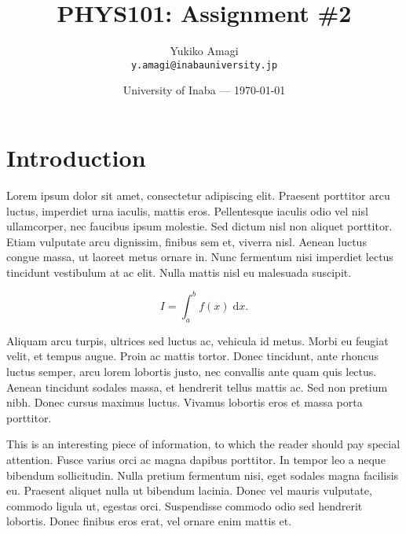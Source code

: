 \documentclass{article}
\title{PHYS101: Assignment \#2} %
\author{Yukiko Amagi\\ \texttt{y.amagi@inabauniversity.jp}} %
\date{University of Inaba --- \today} %
\begin{document}
\maketitle %


\section*{Introduction} %

Lorem ipsum dolor sit amet, consectetur adipiscing elit. Praesent porttitor arcu luctus, imperdiet urna iaculis, mattis eros. Pellentesque iaculis odio vel nisl ullamcorper, nec faucibus ipsum molestie. Sed dictum nisl non aliquet porttitor. Etiam vulputate arcu dignissim, finibus sem et, viverra nisl. Aenean luctus congue massa, ut laoreet metus ornare in. Nunc fermentum nisi imperdiet lectus tincidunt vestibulum at ac elit. Nulla mattis nisl eu malesuada suscipit.

\begin{equation}
	I = \int_{a}^{b} f(x) \; \text{d}x.
\end{equation}

Aliquam arcu turpis, ultrices sed luctus ac, vehicula id metus. Morbi eu feugiat velit, et tempus augue. Proin ac mattis tortor. Donec tincidunt, ante rhoncus luctus semper, arcu lorem lobortis justo, nec convallis ante quam quis lectus. Aenean tincidunt sodales massa, et hendrerit tellus mattis ac. Sed non pretium nibh. Donec cursus maximus luctus. Vivamus lobortis eros et massa porta porttitor.

\begin{info} %
	This is an interesting piece of information, to which the reader should pay special attention. Fusce varius orci ac magna dapibus porttitor. In tempor leo a neque bibendum sollicitudin. Nulla pretium fermentum nisi, eget sodales magna facilisis eu. Praesent aliquet nulla ut bibendum lacinia. Donec vel mauris vulputate, commodo ligula ut, egestas orci. Suspendisse commodo odio sed hendrerit lobortis. Donec finibus eros erat, vel ornare enim mattis et.
\end{info}

\end{document}
